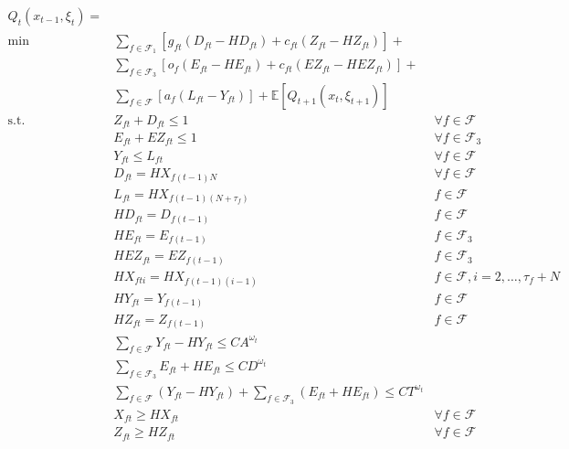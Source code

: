 \documentclass[12pt]{article}
\begin{document}
	\begin{subequations}
		\begin{align}
		Q_t(x_{t-1}, \xi_t)  = & &\\
		\min \quad & \sum_{f \in \mathcal{F}_1} \left[ g_{ft} (D_{ft} - HD_{ft}) + c_{ft} (Z_{ft} - HZ_{ft}) \right]  + & \nonumber \\
		& \sum_{f \in \mathcal{F}_3} \left[ o_f(E_{ft} - HE_{ft}) + c_{ft}(EZ_{ft} - HEZ_{ft}) \right] + & \nonumber\\ 
		& \sum_{f \in \mathcal{F}} \left[ a_f (L_{ft} - Y_{ft})\right]  + \mathbb{E}\left[Q_{t+1}(x_{t},\xi_{t+1}) \right] &\\
		\text{s.t.} \quad & Z_{ft} + D_{ft} \leq 1 & \forall f \in \mathcal{F} \label{cons:cancelORTOt}\\
		& E_{ft} + EZ_{ft} \leq 1 & \forall f \in \mathcal{F}_3 \label{cons:cancelTO2t}\\
		& Y_{ft} \leq L_{ft} & \forall f \in \mathcal{F} \label{cons:arrlandt}\\
		& D_{ft} = HX_{f(t-1)N} & \forall f \in \mathcal{F} \label{cons:TOHistt1}\\
		& L_{ft} = HX_{f(t-1)(N+\tau_{f})}& f \in \mathcal{F} \label{cons:landHistt}\\
		& HD_{ft} = D_{f(t-1)} & f \in \mathcal{F} \label{cons:TOHistt2}\\
		& HE_{ft} = E_{f(t-1)} & f \in \mathcal{F}_3 \label{cons:TO2Histt}\\
		& HEZ_{ft} = EZ_{f(t-1)} & f \in \mathcal{F}_3 \label{cons:cancelTO2Histt}\\
		& HX_{fti} = HX_{f(t-1)(i-1)} & f \in \mathcal{F}, i = 2, \dots, \tau_{f} + N \label{cons:planHistt}\\
		& HY_{ft} = Y_{f(t-1)} & f \in \mathcal{F} \label{cons:arrHistt}\\
		& HZ_{ft} = Z_{f(t-1)} & f \in \mathcal{F} \label{cons:cancelHistt}\\
		& \sum_{f \in \mathcal{F}} Y_{ft} - HY_{ft} \leq CA^{\omega_t} & \label{cons:arrCapt}\\
		& \sum_{f \in \mathcal{F}_3} E_{ft} + HE_{ft} \leq CD^{\omega_t} &\label{cons:deptCapt}\\
		& \sum_{f \in \mathcal{F}} (Y_{ft} - HY_{ft}) + \sum_{f \in \mathcal{F}_3} (E_{ft} + HE_{ft}) \leq CT^{\omega_t} & \label{cons:totCapt}\\
		& X_{ft} \geq HX_{ft} & \forall f \in \mathcal{F} \label{cons:transXt}\\
		& Z_{ft} \geq HZ_{ft} & \forall f \in \mathcal{F} \label{cons:transZt}\\

\end{align}
\end{subequations}
\end{document}
